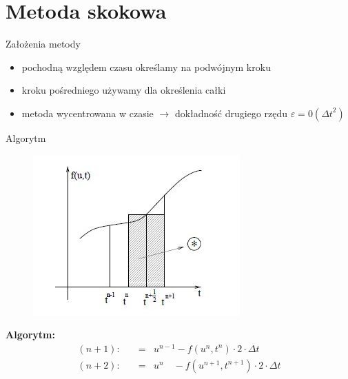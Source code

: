 \section{Metoda skokowa}
\begin{frame}{Założenia metody}
	\begin{itemize}
	\item pochodną względem czasu określamy na podwójnym kroku
    \item kroku pośredniego używamy dla określenia całki
    \item metoda wycentrowana w czasie $\rightarrow $ dokładność drugiego rzędu $\varepsilon = 0({\Delta t}^2)$
	\end{itemize}
\end{frame}
\begin{frame}{Algorytm}
	\begin{figure}
	\includegraphics[height=0.5\textheight]{img/22/metoda_skokowa.jpg}
	\end{figure}
    \textbf{Algorytm:}
    $$ \begin{array}{rcl}
      (n+1):\quad &=&u^{n-1} -f(u^n,t^n)\cdot 2 \cdot \Delta t\\
      (n+2):\quad &=&u^n \quad -f(u^{n+1},t^{n+1})\cdot 2 \cdot \Delta t
      \end{array} $$
    
\end{frame}

